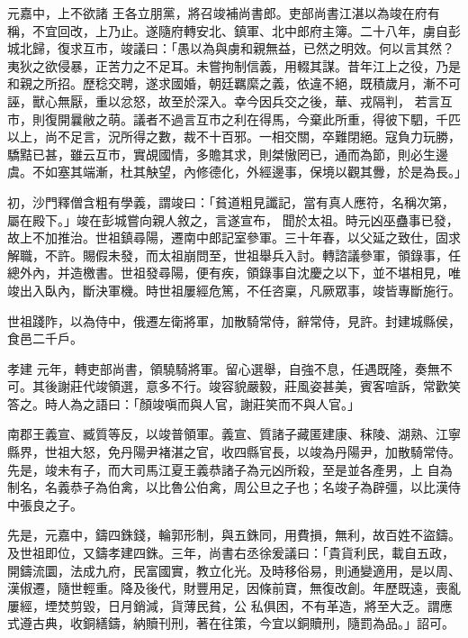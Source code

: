 \begin{pinyinscope}
 元嘉中，上不欲諸
 王各立朋黨，將召竣補尚書郎。吏部尚書江湛以為竣在府有稱，不宜回改，上乃止。遂隨府轉安北、鎮軍、北中郎府主簿。二十八年，虜自彭城北歸，復求互市，竣議曰：「愚以為與虜和親無益，已然之明效。何以言其然？夷狄之欲侵暴，正苦力之不足耳。未嘗拘制信義，用輟其謀。昔年江上之役，乃是和親之所招。歷稔交聘，遂求國婚，朝廷羈縻之義，依違不絕，既積歲月，漸不可誣，獸心無厭，重以忿怒，故至於深入。幸今因兵交之後，華、戎隔判，
 若言互市，則復開曩敝之萌。議者不過言互市之利在得馬，今棄此所重，得彼下駟，千匹以上，尚不足言，況所得之數，裁不十百邪。一相交關，卒難閉絕。寇負力玩勝，驕黠已甚，雖云互市，實覘國情，多贍其求，則桀慠罔已，通而為節，則必生邊虞。不如塞其端漸，杜其觖望，內修德化，外經邊事，保境以觀其釁，於是為長。」



 初，沙門釋僧含粗有學義，謂竣曰：「貧道粗見讖記，當有真人應符，名稱次第，屬在殿下。」竣在彭城嘗向親人敘之，言遂宣布，
 聞於太祖。時元凶巫蠱事已發，故上不加推治。世祖鎮尋陽，遷南中郎記室參軍。三十年春，以父延之致仕，固求解職，不許。賜假未發，而太祖崩問至，世祖舉兵入討。轉諮議參軍，領錄事，任總外內，并造檄書。世祖發尋陽，便有疾，領錄事自沈慶之以下，並不堪相見，唯竣出入臥內，斷決軍機。時世祖屢經危篤，不任咨稟，凡厥眾事，竣皆專斷施行。



 世祖踐阼，以為侍中，俄遷左衛將軍，加散騎常侍，辭常侍，見許。封建城縣侯，食邑二千戶。



 孝建
 元年，轉吏部尚書，領驍騎將軍。留心選舉，自強不息，任遇既隆，奏無不可。其後謝莊代竣領選，意多不行。竣容貌嚴毅，莊風姿甚美，賓客喧訴，常歡笑答之。時人為之語曰：「顏竣嗔而與人官，謝莊笑而不與人官。」



 南郡王義宣、臧質等反，以竣普領軍。義宣、質諸子藏匿建康、秣陵、湖熟、江寧縣界，世祖大怒，免丹陽尹褚湛之官，收四縣官長，以竣為丹陽尹，加散騎常侍。先是，竣未有子，而大司馬江夏王義恭諸子為元凶所殺，至是並各產男，上
 自為制名，名義恭子為伯禽，以比魯公伯禽，周公旦之子也；名竣子為辟彊，以比漢侍中張良之子。



 先是，元嘉中，鑄四銖錢，輪郭形制，與五銖同，用費損，無利，故百姓不盜鑄。及世祖即位，又鑄孝建四銖。三年，尚書右丞徐爰議曰：「貴貨利民，載自五政，開鑄流圜，法成九府，民富國實，教立化光。及時移俗易，則通變適用，是以周、漢俶遷，隨世輕重。降及後代，財豐用足，因條前寶，無復改創。年歷既遠，喪亂屢經，堙焚剪毀，日月銷減，貨薄民貧，公
 私俱困，不有革造，將至大乏。謂應式遵古典，收銅繕鑄，納贖刊刑，著在往策，今宜以銅贖刑，隨罰為品。」詔可。




\end{pinyinscope}
